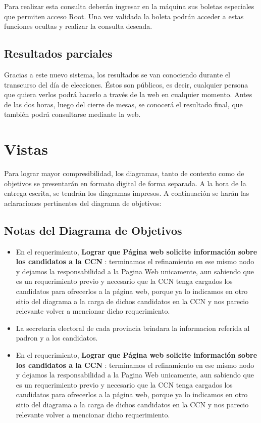 \documentclass[spanish, 10pt,a4paper]{article}
\numberwithin{equation}{section} %
\begin{document}
	Para realizar esta consulta deberán ingresar en la máquina sus boletas especiales que permiten acceso Root. Una vez validada la boleta podrán acceder a estas funciones ocultas y realizar la consulta deseada. 

\subsection{Resultados parciales}
	Gracias a este nuevo sistema, los resultados se van conociendo durante el transcurso del día de elecciones. Éstos son públicos, es decir, cualquier persona que quiera verlos podrá hacerlo a través de la web en cualquier momento.
	Antes de las dos horas, luego del cierre de mesas, se conocerá el resultado final, que también podrá consultarse mediante la web. 

\section{Vistas}
	Para lograr mayor compresibilidad, los diagramas, tanto de contexto como de objetivos se presentarán en formato digital de forma separada. A la hora de la entrega escrita, se tendrán los diagramas impresos. 
	A continuación se harán las aclaraciones pertinentes del diagrama de objetivos:

\subsection{Notas del Diagrama de Objetivos}
\begin{itemize}
	\item En el requerimiento, \textbf{Lograr que Página web solicite información sobre los candidatos a la CCN} : terminamos el refinamiento en ese mismo nodo y dejamos la responsabilidad a la Pagina Web unicamente, aun sabiendo que es un requerimiento previo y necesario que la CCN tenga cargados los candidatos para ofrecerlos a la página web, porque ya lo indicamos en otro sitio del diagrama a la carga de dichos candidatos en la CCN y nos 
parecio relevante volver a mencionar dicho requerimiento.

	\item  La secretaria electoral de cada provincia brindara la informacion referida al padron y a los candidatos.

	\item En el requerimiento, \textbf{Lograr que Página web solicite información sobre los candidatos a la CCN} : terminamos el refinamiento en ese mismo nodo y dejamos la responsabilidad a la Pagina Web unicamente, aun sabiendo que es un requerimiento previo y necesario que la CCN tenga cargados los candidatos para ofrecerlos a la página web, porque ya lo indicamos en otro sitio del diagrama a la carga de dichos candidatos en la CCN y nos parecio relevante volver a mencionar dicho requerimiento.
	\end{itemize}
\newpage
\end{document}
